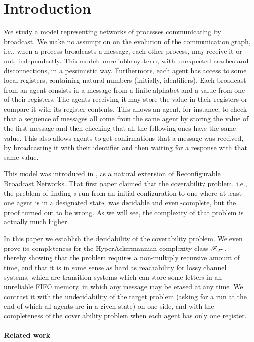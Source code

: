 \section{Introduction}

We study a model representing networks of processes communicating by broadcast. We make no assumption on the evolution of the communication graph, i.e., when a process broadcasts a message, each other process, may receive it or not, independently. This models unreliable systems, with unexpected crashes and disconnections, in a pessimistic way. 
Furthermore, each agent has access to some local registers, containing natural numbers (initially, identifiers). Each broadcast from an agent consists in a message from a finite alphabet and a value from one of their registers. The agents receiving it may store the value in their registers or compare it with its register contents. 
This allows an agent, for instance, to check that a sequence of messages all come from the same agent by storing the value of the first message and then checking that all the following ones have the same value.
This also allows agents to get confirmations that a message was received, by broadcasting it with their identifier and then waiting for a response with that same value.

This model was introduced in \cite{DST2013}, as a natural extension of Reconfigurable Broadcast Networks. That first paper claimed that the coverability problem, i.e., the problem of finding a run from an initial configuration to one where at least one agent is in a designated state, was decidable and even \PSPACE-complete, but the proof turned out to be wrong. As we will see, the complexity of that problem is actually much higher.

In this paper we establish the decidability of the coverability problem. We even prove its completeness for the HyperAckermannian complexity class $\mathscr{F}_{\omega^\omega}$, thereby showing that the problem requires a non-multiply recursive amount of time, and that it is in some sense as hard as reachability for lossy channel systems, which are transition systems which can store some letters in an unreliable FIFO memory, in which any message may be erased at any time. 
We contrast it with the undecidability of the target problem (asking for a run at the end of which all agents are in a given state) on one side, and with the \NP-completeness of the cover ability problem when each agent has only one register. 

\paragraph*{Related work}

